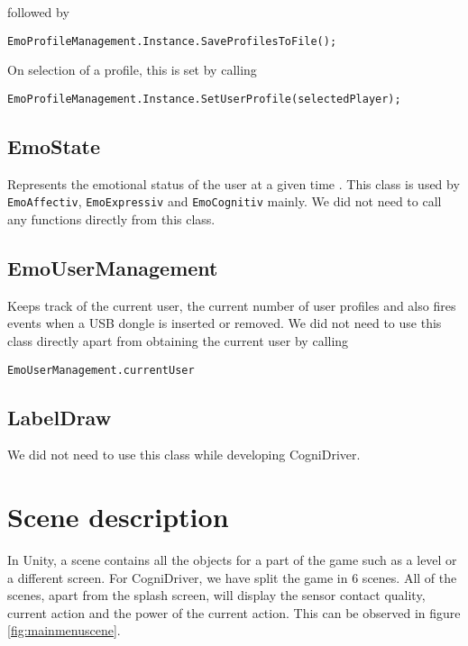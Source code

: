 followed by

\begin{Verbatim}[frame=single, framesep=3mm]
EmoProfileManagement.Instance.SaveProfilesToFile();
\end{Verbatim}

On selection of a profile, this is set by calling

\begin{Verbatim}[frame=single, framesep=3mm]
EmoProfileManagement.Instance.SetUserProfile(selectedPlayer);
\end{Verbatim}

\subsection{EmoState}
Represents the emotional status of the user at a given time \cite{emotivSDKUserManual}. This class is used by \texttt{EmoAffectiv}, \texttt{EmoExpressiv} and \texttt{EmoCognitiv} mainly. We did not need to call any functions directly from this class.

\subsection{EmoUserManagement}
Keeps track of the current user, the current number of user profiles and also fires events when a USB dongle is inserted or removed. We did not need to use this class directly apart from obtaining the current user by calling

\begin{Verbatim}[frame=single, framesep=3mm]
EmoUserManagement.currentUser
\end{Verbatim}

\subsection{LabelDraw}
We did not need to use this class while developing CogniDriver.

\section{Scene description}
In Unity, a scene contains all the objects for a part of the game such as a level or a different screen. For CogniDriver, we have split the game in 6 scenes. All of the scenes, apart from the splash screen, will display the sensor contact quality, current action and the power of the current action. This can be observed in figure \ref{fig:mainmenuscene}.

